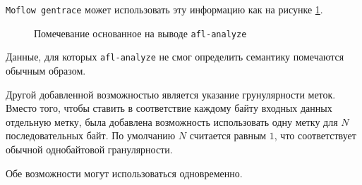 \texttt{Moflow gentrace} может использовать эту информацию как на рисунке \ref{fig:granularity}.
\begin{figure}[H]
    \caption{Помечевание основанное на выводе \texttt{afl-analyze}}
    \label{fig:granularity}
\end{figure}
Данные, для которых \texttt{afl-analyze} не смог определить семантику помечаются обычным образом.

Другой добавленной возможностью является указание грунулярности меток. Вместо того, чтобы ставить в соответствие каждому байту входных данных отдельную метку, была добавлена возможность использовать одну метку для $N$ последовательных байт. По умолчанию $N$ считается равным $1$, что соответствует обычной однобайтовой гранулярности.

Обе возможности могут использоваться одновременно.

